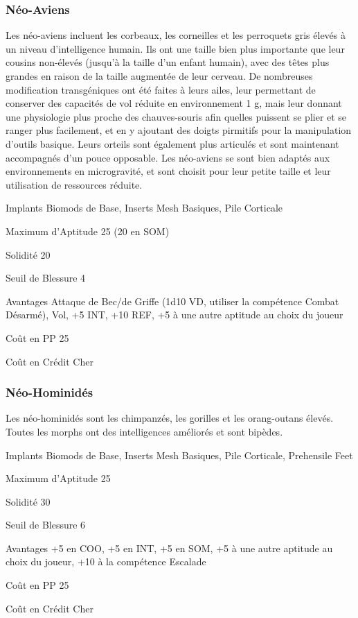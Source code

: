 \subsubsection{Néo-Aviens} \label{sec:starting-neo-avians} 

Les néo-aviens incluent les corbeaux, les corneilles et les perroquets gris élevés à un niveau d'intelligence humain. Ils ont une taille bien plus importante que leur cousins non-élevés (jusqu'à la taille d'un enfant humain), avec des têtes plus grandes en raison de la taille augmentée de leur cerveau. De nombreuses modification transgéniques ont été faites à leurs ailes, leur permettant de conserver des capacités de vol réduite en environnement 1 g, mais leur donnant une physiologie plus proche des chauves-souris afin quelles puissent se plier et se ranger plus facilement, et en y ajoutant des doigts pirmitifs pour la manipulation d'outils basique. Leurs orteils sont également plus articulés et sont maintenant accompagnés d'un pouce opposable. Les néo-aviens se sont bien adaptés aux environnements en microgravité, et sont choisit pour leur petite taille et leur utilisation de ressources réduite. 

\begin{description*} \item[Implants] Biomods de Base, Inserts Mesh Basiques, Pile Corticale\item[Maximum d'Aptitude] 25 (20 en SOM) \item[Solidité] 20 \item[Seuil de Blessure] 4 \item[Avantages] Attaque de Bec/de Griffe (1d10 VD, utiliser la compétence Combat Désarmé), Vol, +5 INT, +10 REF, +5 à une autre aptitude au choix du joueur\item[Coût en PP] 25 \item[Coût en Crédit] Cher \end{description*} 

\subsubsection{Néo-Hominidés} \label{sec:starting-neo-hominids} 

Les néo-hominidés sont les chimpanzés, les gorilles et les orang-outans élevés. Toutes les morphs ont des intelligences améliorés et sont bipèdes. 

\begin{description*} 
   \item[Implants] Biomods de Base, Inserts Mesh Basiques, Pile Corticale, Prehensile Feet
   \item[Maximum d'Aptitude] 25
   \item[Solidité] 30
   \item[Seuil de Blessure] 6
   \item[Avantages] +5 en COO, +5 en INT, +5 en SOM, +5 à une autre aptitude au choix du joueur, +10 à la compétence Escalade
   \item[Coût en PP] 25
   \item[Coût en Crédit] Cher
\end{description*} 

